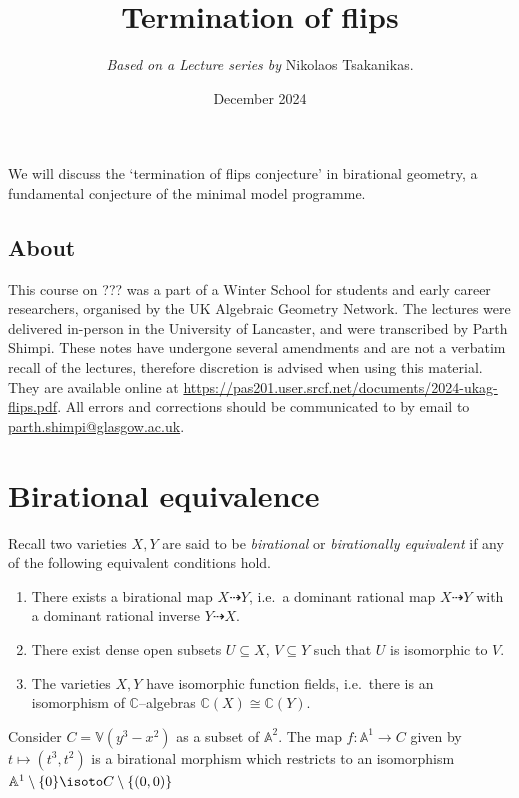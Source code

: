 \title{Termination of flips}
\author{\textit{Based on a Lecture series by} Nikolaos Tsakanikas.}
\date{December 2024}
\maketitle

We will discuss the `termination of flips conjecture' in birational geometry, a
fundamental conjecture of the minimal model programme.

\subsection{About} This course on ??? was a part of a Winter
School for students and early career researchers, organised by the UK Algebraic
Geometry Network. The lectures were delivered in-person in the University of
Lancaster, and were transcribed by Parth Shimpi. These notes have undergone
several amendments and are not a verbatim recall of the lectures, therefore
discretion is advised when using this material. They are available online at
\url{https://pas201.user.srcf.net/documents/2024-ukag-flips.pdf}.
All errors and corrections should be communicated to by email to
\url{parth.shimpi@glasgow.ac.uk}.

\section{Birational equivalence}
Recall two varieties \(X,Y\) are said to be \emph{birational} or
\emph{birationally equivalent} if any of the following equivalent conditions
hold.
\begin{enumerate}
    \item There exists a birational map \(X\dashrightarrow Y\), i.e.\ a dominant
rational map \(X\dashrightarrow Y\) with a dominant rational inverse
\(Y\dashrightarrow X\).
\item There exist dense open subsets \(U\subseteq X\), \(V\subseteq Y\) such
that \(U\) is isomorphic to \(V\).
\item The varieties \(X,Y\) have isomorphic function fields, i.e.\ there is an
isomorphism of \(\mathbb{C}\)--algebras \(\mathbb{C}(X)\cong \mathbb{C}(Y)\).
\end{enumerate}

\begin{example}
Consider \(C=\mathbb{V}(y^3-x^2)\) as a subset of \(\mathbb{A}^2\). The map
\(f:\mathbb{A}^1\to C\) given by \(t\mapsto (t^3,t^2)\) is a birational morphism
which restricts to an isomorphism \(\mathbb{A}^1\setminus\{0\}\isoto
C\setminus\{(0,0)\}\)
\end{example}

